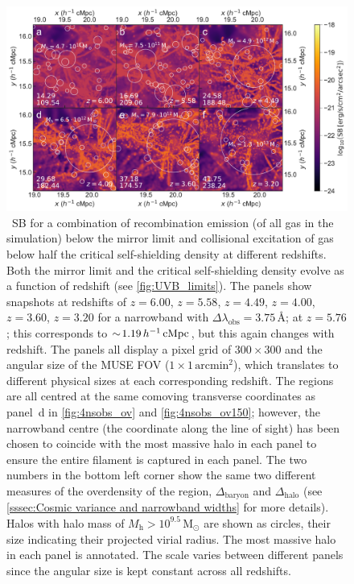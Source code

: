 \begin{figure}
    \centering
    \includegraphics[width=\linewidth]{"Plots/Chapter1/Redshift_SB_evolution"}
    \caption[Observed \lya\ surface brightness at different redshifts]
    {\lya\ SB for a combination of recombination emission (of all gas in the simulation) below the mirror limit and collisional excitation of gas below half the critical self-shielding density at different redshifts. Both the mirror limit and the critical self-shielding density evolve as a function of redshift (see \cref{fig:UVB_limits}). The panels show snapshots at redshifts of $z=6.00$, $z=5.58$, $z=4.49$, $z=4.00$, $z=3.60$, $z=3.20$ for a narrowband with $\Delta \lambda_\text{obs} = 3.75 \, \text{\AA}$; at $z=5.76$; this corresponds to $\sim \! 1.19 \, h^{-1} \, \mathrm{cMpc}$, but this again changes with redshift. The panels all display a pixel grid of $300 \times 300$ and the angular size of the MUSE FOV ($1 \times 1 \, \mathrm{arcmin}^2$), which translates to different physical sizes at each corresponding redshift. The regions are all centred at the same comoving transverse coordinates as panel~d in \cref{fig:4nsobs_ov} and \cref{fig:4nsobs_ov150}; however, the narrowband centre (the coordinate along the line of sight) has been chosen to coincide with the most massive halo in each panel to ensure the entire filament is captured in each panel. The two numbers in the bottom left corner show the same two different measures of the overdensity of the region, $\Delta_\mathrm{baryon}$ and $\Delta_\mathrm{halo}$ (see \cref{sssec:Cosmic variance and narrowband widths} for more details). Halos with halo mass of $M_\mathrm{h} > 10^{9.5} \, \mathrm{M_\odot}$ are shown as circles, their size indicating their projected virial radius. The most massive halo in each panel is annotated. The scale varies between different panels since the angular size is kept constant across all redshifts.}
    \label{fig:4nsobs_mos}
\end{figure}

